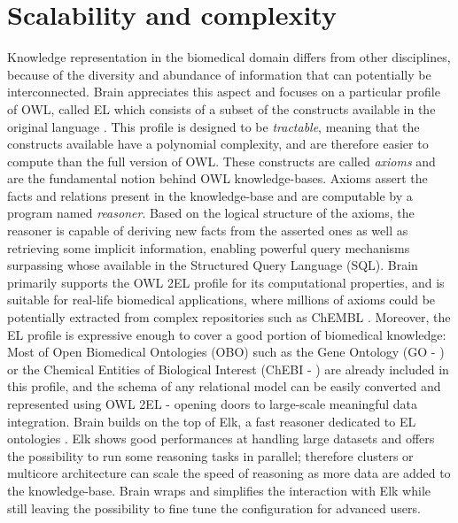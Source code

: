 \documentclass{bioinfo}
\begin{document}
\section{Scalability and complexity}
Knowledge representation in the biomedical domain differs from other disciplines, because of the diversity and abundance of
information that can potentially be interconnected. Brain appreciates this aspect and focuses on a particular profile of OWL, called EL
which consists of a subset of the constructs available in the original language \citep{Motik2009}. This profile is
designed to be \emph{tractable}, meaning that the constructs available have a polynomial complexity,
and are therefore easier to compute than the full
version of OWL.
These constructs are called \emph{axioms} and are the fundamental notion behind OWL knowledge-bases.
Axioms assert the facts and relations present in the knowledge-base and are computable by a program named \emph{reasoner}.
Based on the logical structure of the axioms, the reasoner is capable of deriving new facts from the asserted ones as well as retrieving
some implicit information, enabling powerful query mechanisms surpassing whose available in the Structured Query Language (SQL).
Brain primarily supports the OWL 2EL profile for its computational properties, and is suitable for real-life biomedical applications,
where millions of axioms could be potentially extracted from complex repositories such as ChEMBL \citep{Gaulton2012}.
Moreover, the EL profile is expressive enough to cover a good portion of biomedical knowledge: Most of Open Biomedical Ontologies (OBO)
such as the Gene Ontology (GO - \citealp{Ashburner2000}) or
the Chemical Entities of Biological Interest (ChEBI - \citealp{DeMatos2010}) are already included in this
profile, and the schema of any relational model can be easily
converted and represented using OWL 2EL - opening doors to large-scale meaningful data integration.
Brain builds on the top of Elk, a fast reasoner dedicated to EL ontologies \citep{YevgenyKazakov2011}. Elk shows good
performances at handling
large datasets and offers the possibility to run some reasoning tasks in parallel; therefore
clusters or multicore architecture can scale the speed of reasoning as more data are added to the knowledge-base.
Brain wraps and simplifies the interaction with Elk while still leaving the possibility to fine tune
the configuration for advanced users.
\end{document}
